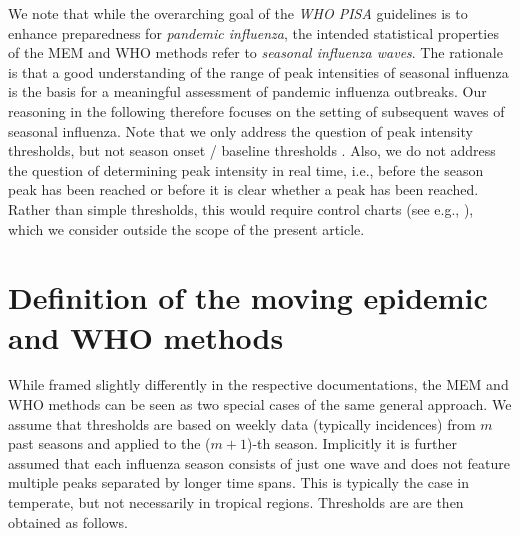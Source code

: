 \documentclass{article}
\begin{document}
\noindent We note that while the overarching goal of the \textit{WHO PISA} guidelines is to enhance preparedness for \textit{pandemic influenza}, the intended statistical properties of the MEM and WHO methods refer to \textit{seasonal influenza waves}. The rationale is that a good understanding of the range of peak intensities of seasonal influenza is the basis for a meaningful assessment of pandemic influenza outbreaks. Our reasoning in the following therefore focuses on the setting of subsequent waves of seasonal influenza. Note that we only address the question of peak intensity thresholds, but not season onset / baseline thresholds \citep{Vega2013}. Also, we do not address the question of determining peak intensity in real time, i.e., before the season peak has been reached or before it is clear whether a peak has been reached. Rather than simple thresholds, this would require control charts (see e.g., \citealt{Liu2019}), which we consider outside the scope of the present article.

\section{Definition of the moving epidemic and WHO methods}
\label{sec:definitions}

While framed slightly differently in the respective documentations, the MEM and WHO methods can be seen as two special cases of the same general approach. We assume that thresholds are based on weekly data (typically incidences) from $m$ past seasons and applied to the ($m + 1$)-th season. Implicitly it is further assumed that each influenza season consists of just one wave and does not feature multiple peaks separated by longer time spans. This is typically the case in temperate, but not necessarily in tropical regions. Thresholds are are then obtained as follows.
\end{document}
